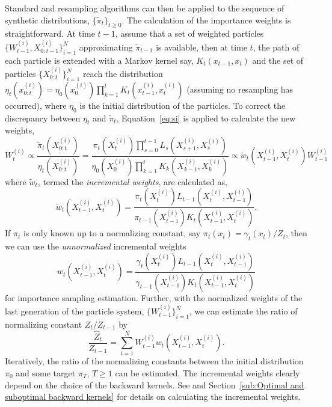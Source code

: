 Standard \sis and resampling algorithms can then be applied to the sequence of synthetic distributions, $\{\tilde\pi_t\}_{t\ge0}$. The calculation of the importance weights is straightforward. At time $t-1$, assume that a set of weighted particles $\{W_{t-1}^{(i)},X_{0:t-1}^{(i)}\}_{i=1}^N$ approximating $\tilde\pi_{t-1}$ is available, then at time $t$, the path of each particle is extended with a Markov kernel say, $K_t(x_{t-1}, x_t)$ and the set of particles $\{X_{0:t}^{(i)}\}_{i=1}^N$ reach the distribution $\eta_t(x_{0:t}^{(i)}) = \eta_0(x_0^{(i)})\prod_{k=1}^tK_t(x_{t-1}^{(i)}, x_t^{(i)})$ (assuming no resampling has occurred), where $\eta_0$ is the initial distribution of the particles. To correct the discrepancy between $\eta_t$ and $\tilde\pi_t$, Equation~\eqref{eq:si} is applied to calculate the new weights,
\begin{equation}
  W_t^{(i)} \propto \frac{\tilde\pi_t(X_{0:t}^{(i)})}{\eta_t(X_{0:t}^{(i)})}
  = \frac{\pi_t(X_t^{(i)})\prod_{s=0}^{t-1}L_s(X_{s+1}^{(i)}, X_s^{(i)})}
  {\eta_0(X_0^{(i)})\prod_{k=1}^tK_k(X_{k-1}^{(i)},X_k^{(i)})}
  \propto \tilde{w}_t(X_{t-1}^{(i)}, X_t^{(i)})W_{t-1}^{(i)}
\end{equation}
where $\tilde{w}_t$, termed the \emph{incremental weights}, are calculated as,
\begin{equation}
  \tilde{w}_t(X_{t-1}^{(i)},X_t^{(i)}) =
  \frac{\pi_t(X_t^{(i)})L_{t-1}(X_t^{(i)}, X_{t-1}^{(i)})}
  {\pi_{t-1}(X_{t-1}^{(i)})K_t(X_{t-1}^{(i)}, X_t^{(i)})}.
\end{equation}
If $\pi_t$ is only known up to a normalizing constant, say $\pi_t(x_t) = \gamma_t(x_t)/Z_t$, then we can use the \emph{unnormalized} incremental weights
\begin{equation}
  w_t(X_{t-1}^{(i)},X_t^{(i)}) =
  \frac{\gamma_t(X_t^{(i)})L_{t-1}(X_t^{(i)}, X_{t-1}^{(i)})}
  {\gamma_{t-1}(X_{t-1}^{(i)})K_t(X_{t-1}^{(i)}, X_t^{(i)})}
\end{equation}
for importance sampling estimation. Further, with the normalized weights of the last generation of the particle system, $\{W_{t-1}^{(i)}\}_{i=1}^N$, we can estimate the ratio of normalizing constant $Z_t/Z_{t-1}$ by
\begin{equation}
  \frac{\hat{Z}_t}{Z_{t-1}} =
  \sum_{i=1}^N W_{t-1}^{(i)}w_t(X_{t-1}^{(i)},X_t^{(i)}).
  \label{eq:ratio normalized}
\end{equation}
Iteratively, the ratio of the normalizing constants between the initial distribution $\pi_0$ and some target $\pi_T$, $T\ge1$ can be estimated. The incremental weights clearly depend on the choice of the backward kernels. See \cite{DelMoral:2006hc} and Section~\ref{sub:Optimal and suboptimal backward kernels} for details on calculating the incremental weights.

